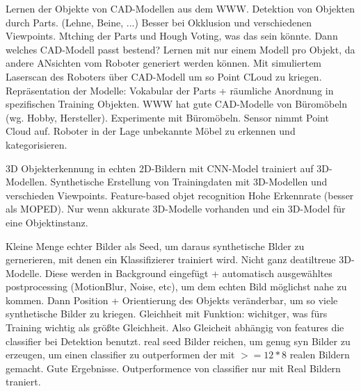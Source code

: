 \citep{modelsWWW}
Lernen der Objekte von CAD-Modellen aus dem WWW. \newline
Detektion von Objekten durch Parts. (Lehne, Beine, ...) Besser bei Okklusion und verschiedenen Viewpoints. Mtching der Parts und Hough Voting, was das sein könnte. Dann welches CAD-Modell passt bestend? \newline
Lernen mit nur einem Modell pro Objekt, da andere ANsichten vom Roboter generiert werden können. Mit simuliertem Laserscan des Roboters über CAD-Modell um so Point CLoud zu kriegen.\newline
Repräsentation der Modelle: Vokabular der Parts + räumliche Anordnung in spezifischen Training Objekten. \newline
WWW hat gute CAD-Modelle von Büromöbeln (wg. Hobby, Hersteller). Experimente mit Büromöbeln. Sensor nimmt Point Cloud auf. \newline
Roboter in der Lage unbekannte Möbel zu erkennen und kategorisieren. \par


\cite{3DCNNObjRec} \newline
3D Objekterkennung in echten 2D-Bildern mit CNN-Model trainiert auf 3D-Modellen. \newline
Synthetische Erstellung von Trainingdaten mit 3D-Modellen und verschieden Viewpoints. \newline
Feature-based objet recognition \newline
Hohe Erkennrate (besser als MOPED). Nur wenn akkurate 3D-Modelle vorhanden und ein 3D-Model für eine Objektinstanz.


\cite{synthImg} \newline
Kleine Menge echter Bilder als Seed, um daraus synthetische Blder zu gernerieren, mit denen ein Klassifizierer trainiert wird. \newline
Nicht ganz deatiltreue 3D-Modelle. Diese werden in Background eingefügt + automatisch ausgewähltes postprocessing (MotionBlur, Noise, etc), um dem echten Bild möglichst nahe zu kommen. Dann Position + Orientierung des Objekts veränderbar, um so viele synthetische Bilder zu kriegen. \newline
Gleichheit mit Funktion: wichitger, was fürs Training wichtig als größte Gleichheit. Also Gleicheit abhängig von features die classifier bei Detektion benutzt.  real seed Bilder reichen, um genug syn Bilder zu erzeugen, um einen classifier zu outperformen der mit $>=12*8$ realen Bildern gemacht. \newline
Gute Ergebnisse. Outperformence von classifier nur mit Real Bildern traniert. 

